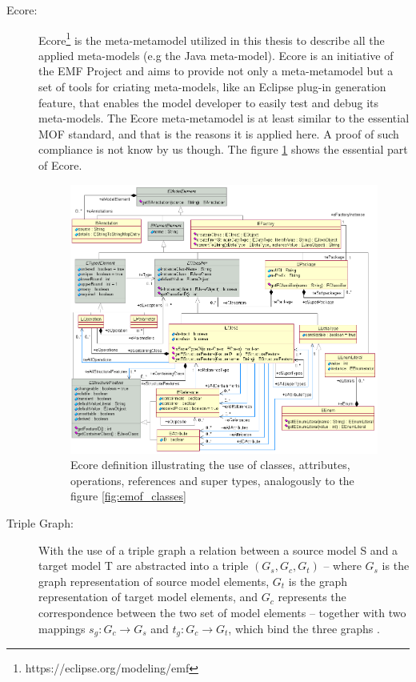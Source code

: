\documentclass[tuberlin,cic,tc,english,noabntcite]{iiufrgs}
\begin{document}
\begin{description}
	\item[Ecore:] Ecore\footnote{https://eclipse.org/modeling/emf} is the meta-metamodel utilized in this thesis to describe all the applied meta-models (e.g the Java meta-model). Ecore is an initiative of the EMF Project and aims to provide not only a meta-metamodel but a set of tools for criating meta-models, like an Eclipse plug-in generation feature, that enables the model developer to easily test and debug its meta-models. The Ecore meta-metamodel is at least similar to the essential MOF standard, and that is the reasons it is applied here. A proof of such compliance is not know by us though. The figure \ref{fig:ecore_relations} shows the essential part of Ecore.

	\begin{figure}[h]
	    \caption{Ecore definition illustrating the use of classes, attributes, operations, references and super types, analogously to the figure \ref{fig:emof_classes}}
	    \begin{center}
	        \includegraphics[width=35em]{ecore_relations}   
	    \end{center}
	    \label{fig:ecore_relations}
	\end{figure}

	\item[Triple Graph:] With the use of a triple graph a relation between a source model S and a target model T are abstracted into a triple $(G_s,G_c,G_t)$ – where $G_s$ is the graph representation of source model elements, $G_t$ is the graph representation of target model elements, and $G_c$ represents the correspondence between the two set of model elements – together with two mappings $s_g: G_c \rightarrow G_s$ and $t_g: G_c \rightarrow G_t$, which bind the three graphs \citep{hermann2011correctness}.
	

\end{description}
\end{document}

